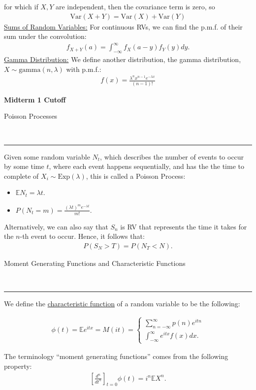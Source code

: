 \documentclass{article}
\newcommand{\header}[1]{\begin{large}\noindent #1\end{large}\\\rule{\textwidth}{0.5pt}}
\newcommand{\sheader}[1]{\underline{#1:}}
\begin{document}
for which if $X, Y$ are independent, then the covariance term is zero, so
\begin{align*}
    \textrm{Var}(X + Y) = \textrm{Var}(X) + \textrm{Var}(Y)
\end{align*}
\sheader{Sums of Random Variables} For continuous RVs, we can find the
p.m.f. of their sum under the convolution:
\begin{align*}
    f_{X + Y}(a) = \int_{-\infty}^{\infty} f_X(a-y)f_Y(y)dy.
\end{align*}
\sheader{Gamma Distribution} We define another distribution, the gamma distribution, $X \sim \textrm{gamma}(n, \lambda)$ with 
p.m.f.:
\begin{align*}
    f(x) = \frac{\lambda^n x^{n - 1} e^{-\lambda x}}{(n - 1)!}
\end{align*}

\textbf{Midterm 1 Cutoff}

\pagebreak

\header{Poisson Processes}

Given some random variable $N_t$, which describes the number of 
events to occur by some time $t$, where each event happens sequentially,
and has the the time to complete of $X_i \sim \textrm{Exp}(\lambda)$,
this is called a Poisson Process:
\begin{itemize}
    \item $\mathbb{E}N_t = \lambda t$.
    \item $P(N_t = m) = \frac{(\lambda t)^m e^{-\lambda t}}{m!}$.
\end{itemize}
Alternatively, we can also say that $S_n$ is RV that represents the time 
it takes for the $n$-th event to occur. Hence, it follows that:
\begin{align*}
    P(S_N > T) = P(N_T < N).
\end{align*}

\header{Moment Generating Functions and Characteristic Functions}

We define the \underline{characteristic function} of a random variable 
to be the following:

\begin{align*}
    \phi(t) = \mathbb{E}e^{itx} = M(it) = \begin{cases}
        \sum_{n = - \infty}^\infty p(n)e^{itn}\\
        \int_{-\infty}^{\infty}e^{itx}f(x)dx.
    \end{cases}
\end{align*}

The terminology ``moment generating functions'' comes from the following 
property:
\begin{align*}
    \left[\frac{d^n}{dt^n}\right]_{t=0} \phi(t) = i^n \mathbb{E}X^n.
\end{align*}
\end{document}
